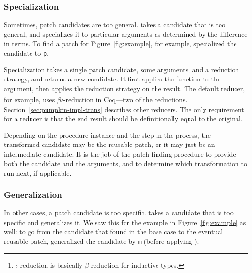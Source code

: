 
\subsubsection*{Specialization}
Sometimes, patch candidates are too general.
 takes a candidate that is too general,
and specializes it to particular arguments as determined by the difference in terms.
To find a patch for Figure~\ref{fig:example}, for example, \sysname
specialized the candidate to \lstinline{p}.

Specialization takes a single patch candidate, some arguments, and a reduction strategy, and returns a new candidate.
It first applies the function to the argument, then applies the reduction strategy on the result.
The default reducer, for example, uses $\beta\iota$-reduction in Coq---two of the  reductions.\footnote{$\iota$-reduction is basically $\beta$-reduction for inductive types.}
Section~\ref{sec:pumpkin-impl-trans} describes other reducers.
The only requirement for a reducer is that the end result should be definitionally equal to the original.

Depending on the procedure instance and the step in the process, the transformed candidate may be the reusable patch,
or it may just be an intermediate candidate.
It is the job of the patch finding procedure to provide both the candidate and the arguments,
and to determine which transformation to run next, if applicable.

\iffalse
It works by combining application with reduction, with just one derivation:

\begin{mathpar}
\small
\hfill\fbox{$\Gamma$ $\vdash$ $(t,\ \vec{a},\ \Downarrow{r}) \Downarrow_{s} t'$ }\\

\inferrule[Specialize]
  { \Gamma \vdash t\ \vec{a} \Downarrow_{r} t'}
  { \Gamma \vdash (t,\ \vec{a},\ \Downarrow_{r}) \Downarrow_{s} t'}
\end{mathpar}
There is just one super weird thing I do not even know if I am allowed to do here:
the reduction strategy $\Downarrow_{r}$ is itself a transformation that reduces a term in an arbitrary way.
\fi

\subsubsection*{Generalization} In other cases, a patch candidate is too specific.
 takes a candidate that is too specific and generalizes it.
We saw this for the example in Figure~\ref{fig:example} as well:
to go from the candidate that \sysname found in the base case to the eventual reusable patch,
\sysname generalized the candidate by \lstinline{m} (before applying ).

